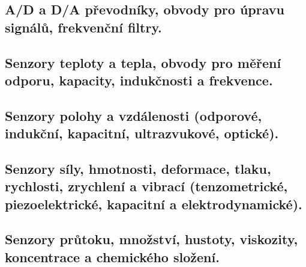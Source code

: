 \subsection{A/D a D/A převodníky, obvody pro úpravu signálů, frekvenční filtry.}

\subsection{Senzory teploty a tepla, obvody pro měření odporu, kapacity, indukčnosti a frekvence.}

\subsection{Senzory polohy a vzdálenosti (odporové, indukční, kapacitní, ultrazvukové, optické).}

\subsection{Senzory síly, hmotnosti, deformace, tlaku, rychlosti, zrychlení a vibrací (tenzometrické, piezoelektrické, kapacitní a elektrodynamické).}

\subsection{Senzory průtoku, množství, hustoty, viskozity, koncentrace a chemického složení.}
